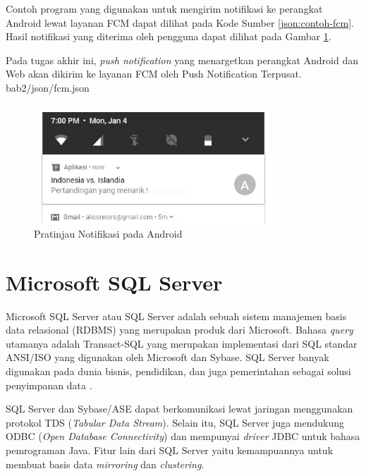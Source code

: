 \par Contoh program yang digunakan untuk mengirim notifikasi ke perangkat Android lewat layanan FCM dapat dilihat pada Kode Sumber \ref{json:contoh-fcm}. Hasil notifikasi yang diterima oleh pengguna dapat dilihat pada Gambar \ref{img:contoh-hasil-fcm}.
\par Pada tugas akhir ini, \textit{push notification} yang menargetkan perangkat Android dan Web akan dikirim ke layanan FCM oleh Push Notification Terpusat.
 {bab2/json/fcm.json}
\begin{figure}[H]
	\centering\includegraphics[width=0.8\textwidth]{bab2/img/fcm.jpg}
	\caption{Pratinjau Notifikasi pada Android}
	\label{img:contoh-hasil-fcm}
\end{figure}

\section{Microsoft SQL Server}
\par Microsoft SQL Server atau SQL Server adalah sebuah sistem manajemen basis data relasional (RDBMS) yang merupakan produk dari Microsoft. Bahasa \textit{query} utamanya adalah Transact-SQL yang merupakan implementasi dari SQL standar ANSI/ISO yang digunakan oleh Microsoft dan Sybase. SQL Server banyak digunakan pada dunia bisnis, pendidikan, dan juga pemerintahan sebagai solusi penyimpanan data \cite{sql-server-online}.
\par SQL Server dan Sybase/ASE dapat berkomunikasi lewat jaringan menggunakan protokol TDS (\textit{Tabular Data Stream}). Selain itu, SQL Server juga mendukung ODBC (\textit{Open Database Connectivity}) dan mempunyai \textit{driver} JDBC untuk bahasa pemrograman Java. Fitur lain dari SQL Server yaitu kemampuannya untuk membuat basis data \textit{mirroring} dan \textit{clustering}.

